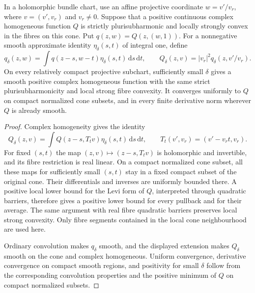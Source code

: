 \begin{lemma}\label{lem:homogeneous-shear-regularization}
In a holomorphic bundle chart, use an affine projective coordinate $w=v'/v_r$, where $v=(v',v_r)$ and $v_r\ne0$. Suppose that a positive continuous complex homogeneous function $Q$ is strictly plurisubharmonic and locally strongly convex in the fibres on this cone. Put $q(z,w)=Q(z,(w,1))$. For a nonnegative smooth approximate identity $\eta_\delta(s,t)$ of integral one, define
\[
 q_\delta(z,w)=\int q(z-s,w-t)\eta_\delta(s,t)\,\mathrm ds\,\mathrm dt,
 \qquad Q_\delta(z,v)=|v_r|^2q_\delta(z,v'/v_r).
\]
On every relatively compact projective subchart, sufficiently small $\delta$ gives a smooth positive complex homogeneous function with the same strict plurisubharmonicity and local strong fibre convexity. It converges uniformly to $Q$ on compact normalized cone subsets, and in every finite derivative norm wherever $Q$ is already smooth.
\end{lemma}
\begin{proof}
Complex homogeneity gives the identity
\[
 Q_\delta(z,v)
 =\int Q(z-s,T_tv)\eta_\delta(s,t)\,\mathrm ds\,\mathrm dt,
 \qquad T_t(v',v_r)=(v'-v_rt,v_r).
\]
For fixed $(s,t)$ the map $(z,v)\mapsto(z-s,T_tv)$ is holomorphic and invertible, and its fibre restriction is real linear. On a compact normalized cone subset, all these maps for sufficiently small $(s,t)$ stay in a fixed compact subset of the original cone. Their differentials and inverses are uniformly bounded there. A positive local lower bound for the Levi form of $Q$, interpreted through quadratic barriers, therefore gives a positive lower bound for every pullback and for their average. The same argument with real fibre quadratic barriers preserves local strong convexity. Only fibre segments contained in the local cone neighbourhood are used here.

Ordinary convolution makes $q_\delta$ smooth, and the displayed extension makes $Q_\delta$ smooth on the cone and complex homogeneous. Uniform convergence, derivative convergence on compact smooth regions, and positivity for small $\delta$ follow from the corresponding convolution properties and the positive minimum of $Q$ on compact normalized subsets.
\end{proof}

